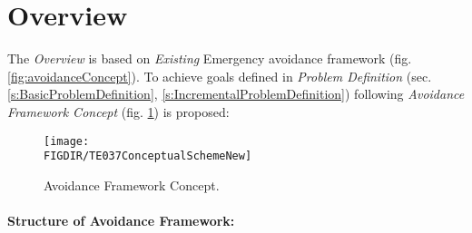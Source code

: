 \newpage    
\section{Overview}\label{s:approachOverview}

\noindent The \emph{Overview} is based on \emph{Existing} Emergency avoidance framework \cite{gomola2017obstacle} (fig. \ref{fig:avoidanceConcept}). To achieve goals defined in \emph{Problem Definition} (sec. \ref{s:BasicProblemDefinition}, \ref{s:IncrementalProblemDefinition}) following \emph{Avoidance Framework Concept} (fig. \ref{fig:AvoidanceFrameworkConceptNew}) is proposed:

\begin{figure}[H]
    \centering
    \texttt{[image: \\FIGDIR/TE037ConceptualSchemeNew]} 
    \caption{Avoidance Framework Concept.}
    \label{fig:AvoidanceFrameworkConceptNew}
\end{figure}


\paragraph{Structure of Avoidance Framework:}

